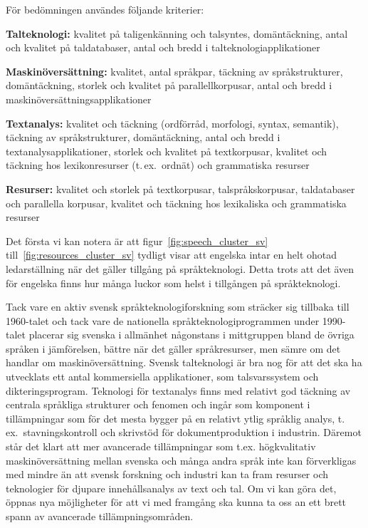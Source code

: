 \begin{multicols}{2}
För bedömningen användes följande kriterier:

\textbf{Talteknologi:} kvalitet på taligenkänning och talsyntes,
domäntäckning, antal och kvalitet på taldatabaser, antal och bredd i
talteknologiapplikationer

\textbf{Maskin\-över\-sätt\-ning:} kvalitet, antal språkpar, täckning av
språkstrukturer, domäntäckning, storlek och kvalitet på
parallellkorpusar, antal och bredd i maskin\-över\-sätt\-ningsapplikationer

\textbf{Textanalys:} kvalitet och täckning (ordförråd, morfologi,
syntax, semantik), täckning av språkstrukturer, domäntäckning, antal
och bredd i textanalysapplikationer, storlek och kvalitet på
textkorpusar, kvalitet och täckning hos lexikonresurser (t.\,ex.~ordnät)
och grammatiska resurser

\textbf{Resurser:} kvalitet och storlek på textkorpusar,
talspråkskorpusar, taldatabaser och parallella korpusar, kvalitet och
täckning hos lexikaliska och grammatiska resurser


Det första vi kan notera är att figur~\ref{fig:speech_cluster_sv}
till~\ref{fig:resources_cluster_sv} tydligt visar att engelska intar
en helt ohotad ledarställning när det gäller tillgång på
språkteknologi. Detta trots att det även för engelska finns hur många
luckor som helst i tillgången på språkteknologi.

Tack vare en aktiv svensk språkteknologiforskning som sträcker sig
tillbaka till 1960-talet och tack vare de nationella
språkteknologiprogrammen under 1990-talet placerar sig svenska i
allmänhet någonstans i mittgruppen bland de övriga språken i
jäm\-fö\-rel\-sen, bättre när det gäller språkresurser, men sämre om det
handlar om maskin\-över\-sätt\-ning. Svensk talteknologi är bra nog för att det ska ha utvecklats ett antal
kommersiella applikationer, som talsvarssystem och
dikteringsprogram. Teknologi för textanalys finns med relativt god
täckning av centrala språkliga strukturer och fenomen och ingår som
komponent i tillämpningar som för det mesta bygger på en relativt
ytlig språklig analys, t.\,ex.~stavningskontroll och skrivstöd för
dokumentproduktion i industrin. Däremot står det klart att mer avancerade tillämpningar som t.ex.
högkvalitativ maskin\-över\-sätt\-ning mellan svenska och många andra språk
inte kan förverkligas med mindre än att svensk forskning och industri
kan ta fram resurser och teknologier för djupare innehållsanalys av
text och tal. Om vi kan göra det, öppnas nya möjligheter för att vi
med framgång ska kunna ta oss an ett brett spann av avancerade
tillämpningsområden.



\end{multicols}
